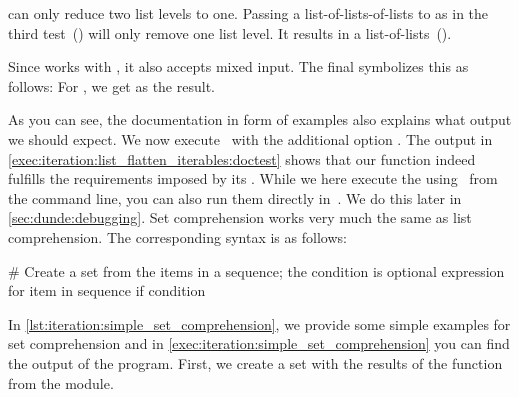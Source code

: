  can only reduce two list levels to one.
Passing a list-of-lists-of-lists to  as in the third test~() will only remove one list level.
It results in a list-of-lists~(\pythonil{[[1], [2], [3], [4], [5], [6]]}).%
%
\begin{sloppypar}%
Since  works with , it also accepts mixed input.
The final  symbolizes this as follows:
For , we get \pythonil{[1, 2, 3, 4, 5, 6, 'a', 'b']} as the result.
\end{sloppypar}%
%
As you can see, the documentation in form of examples also explains what output we should expect.
We now execute \pytest\ with the additional option .
The output in \cref{exec:iteration:list_flatten_iterables:doctest} shows that our function indeed fulfills the requirements imposed by its .%
%
%
%
While we here execute the  using \pytest\ from the command line, you can also run them directly in~\pycharm.
We do this later in \cref{sec:dunde:debugging}.%
%
\FloatBarrier%
\endhsection%
%
%
%
Set comprehension works very much the same as list comprehension.
The corresponding syntax is as follows:%
%
\begin{pythonSyntax}
# Create a set from the items in a sequence; the condition is optional
{expression for item in sequence if condition}
\end{pythonSyntax}
%
%
%
In \cref{lst:iteration:simple_set_comprehension}, we provide some simple examples for set comprehension and in \cref{exec:iteration:simple_set_comprehension} you can find the output of the program.
First, we create a set with the results of the  function from the  module.
